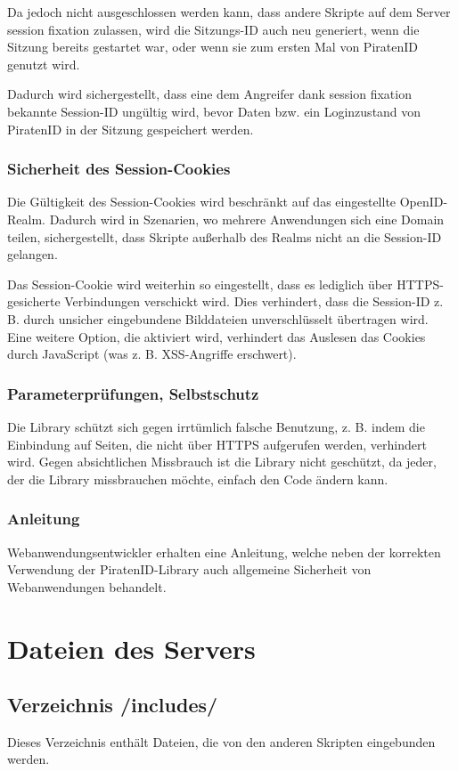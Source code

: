 Da jedoch nicht ausgeschlossen werden kann, dass andere Skripte auf dem Server session fixation zulassen,
wird die Sitzungs-ID auch neu generiert, wenn die Sitzung bereits gestartet war,
oder wenn sie zum ersten Mal von PiratenID genutzt wird.

Dadurch wird sichergestellt, dass eine dem Angreifer dank session fixation bekannte Session-ID ungültig wird,
bevor Daten bzw. ein Loginzustand von PiratenID in der Sitzung gespeichert werden.

\subsubsection{Sicherheit des Session-Cookies}
Die Gültigkeit des Session-Cookies wird beschränkt auf das eingestellte OpenID-Realm.
Dadurch wird in Szenarien, wo mehrere Anwendungen sich eine Domain teilen, sichergestellt,
dass Skripte außerhalb des Realms nicht an die Session-ID gelangen.

Das Session-Cookie wird weiterhin so eingestellt, dass es lediglich über HTTPS-gesicherte Verbindungen verschickt wird.
Dies verhindert, dass die Session-ID z. B. durch unsicher eingebundene Bilddateien unverschlüsselt übertragen wird.
Eine weitere Option, die aktiviert wird, verhindert das Auslesen das Cookies durch JavaScript (was z. B. XSS-Angriffe erschwert).

\subsubsection{Parameterprüfungen, Selbstschutz}
Die Library schützt sich gegen irrtümlich falsche Benutzung,
z. B. indem die Einbindung auf Seiten, die nicht über HTTPS aufgerufen werden, verhindert wird.
Gegen absichtlichen Missbrauch ist die Library nicht geschützt, da jeder, der die Library missbrauchen möchte, einfach den Code ändern kann.

\subsubsection{Anleitung}
Webanwendungsentwickler erhalten eine Anleitung, welche neben der korrekten Verwendung der PiratenID-Library auch allgemeine Sicherheit von Webanwendungen behandelt.


\section{Dateien des Servers}

\subsection{Verzeichnis /includes/}
Dieses Verzeichnis enthält Dateien, die von den anderen Skripten eingebunden werden.

